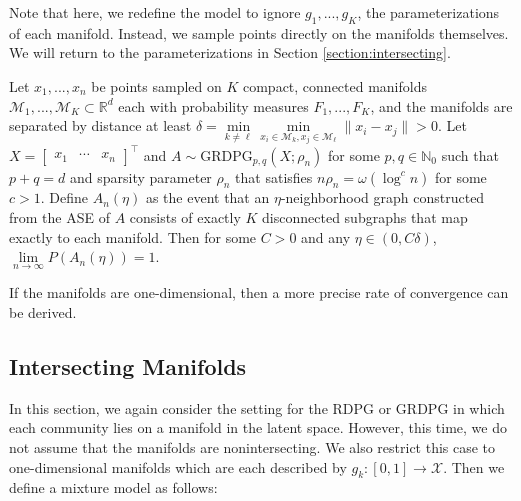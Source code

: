 \documentclass[12pt]{article}
\begin{document}
Note that here, we redefine the model to ignore \(g_1, ..., g_K\), the
parameterizations of each manifold. Instead, we sample points directly
on the manifolds themselves. We will return to the parameterizations in
Section \ref{section:intersecting}.

\begin{theorem}
\label{theorem:nonintersect-grdpg}
Let $x_1, ..., x_n$ be points sampled on $K$ compact, connected manifolds $\mathcal{M}_1, ..., \mathcal{M}_K \subset \mathbb{R}^d$ each with probability measures $F_1, ..., F_K$, and the manifolds are separated by distance at least $\delta = \min\limits_{k \neq \ell} \min\limits_{x_i \in \mathcal{M}_k, x_j \in \mathcal{M}_\ell} \| x_i - x_j \| > 0$. 
Let $X = \begin{bmatrix} x_1 & \cdots & x_n \end{bmatrix}^\top$ and $A \sim \mathrm{GRDPG}_{p,q}(X; \rho_n)$ for some $p, q \in \mathbb{N}_0$ such that $p + q = d$ and sparsity parameter $\rho_n$ that satisfies $n \rho_n = \omega(\log^c n)$ for some $c > 1$. 
Define $A_n(\eta)$ as the event that an $\eta$-neighborhood graph constructed from the ASE of $A$ consists of exactly $K$ disconnected subgraphs that map exactly to each manifold. 
Then for some $C > 0$ and any $\eta \in (0, C \delta)$, $\lim\limits_{n \to \infty} P(A_n(\eta)) = 1$. 
\end{theorem}

If the manifolds are one-dimensional, then a more precise rate of
convergence can be derived.

\hypertarget{intersecting-manifolds}{%
\subsection{Intersecting Manifolds}\label{intersecting-manifolds}}

\label{section:intersecting}

In this section, we again consider the setting for the RDPG or GRDPG in
which each community lies on a manifold in the latent space. However,
this time, we do not assume that the manifolds are nonintersecting. We
also restrict this case to one-dimensional manifolds which are each
described by \(g_k : [0, 1] \to \mathcal{X}\). Then we define a mixture
model as follows:
\end{document}
